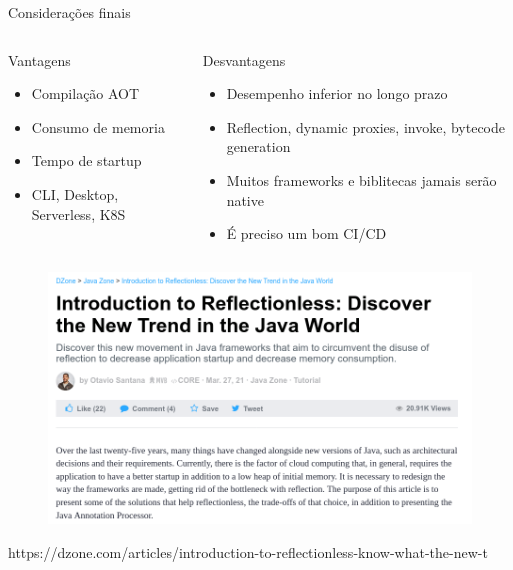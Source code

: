 \documentclass[aspectratio=169]{beamer}
\begin{document}
\begin{frame}{Considerações finais}

	\begin{columns}[T] %

		\begin{column}[T]{4cm} %
			\begin{exampleblock}{Vantagens}
				\begin{itemize}
					\item Compilação AOT
					\item Consumo de memoria
					\item Tempo de startup
					\item CLI, Desktop, Serverless, K8S
				\end{itemize}
			\end{exampleblock}
		\end{column}
		\begin{column}[T]{6cm} %
			\begin{alertblock}{Desvantagens}
				\begin{itemize}
					\item Desempenho inferior no longo prazo
					\item Reflection, dynamic proxies, invoke, bytecode generation
					\item Muitos frameworks e biblitecas jamais serão native
					\item É preciso um bom CI/CD
				\end{itemize}
			\end{alertblock}
		\end{column}
	\end{columns}
\end{frame}


\begin{frame}{}
	\begin{figure}
		\centering
		\includegraphics[width=0.8\linewidth]{Images/otavio}
	\end{figure}
{\tiny https://dzone.com/articles/introduction-to-reflectionless-know-what-the-new-t}
\end{frame}
\end{document}
